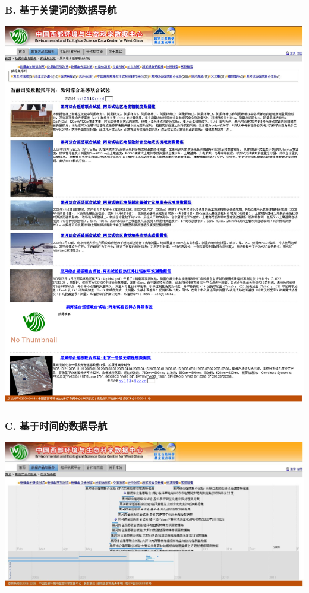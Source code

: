 \documentclass[letterpaper,10pt,english]{sphinxmanual}
\begin{document}
\subsubsection{B. 基于关键词的数据导航}
\label{data_acquire:b}
{\hfill\includegraphics{westdc_nav_keyword.jpg}\hfill}


\subsubsection{C. 基于时间的数据导航}
\label{data_acquire:c}
{\hfill\includegraphics{westdc_nav_time.jpg}\hfill}
\end{document}
